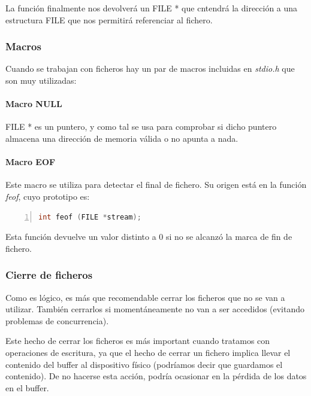 \documentclass[a4paper, 11pt, titlepage]{article}
\begin{document}
            La función finalmente nos devolverá un FILE * que cntendrá la dirección a una estructura FILE 
            que nos permitirá referenciar al fichero. 

        \subsubsection{Macros}

            Cuando se trabajan con ficheros hay un par de macros incluidas en \textit{stdio.h} que son muy 
            utilizadas:

            \paragraph{Macro NULL} FILE * es un puntero, y como tal se usa para comprobar si dicho puntero 
            almacena una dirección de memoria válida o no apunta a nada.

            \paragraph{Macro EOF} Este macro se utiliza para detectar el final de fichero. Su origen está 
            en la función \textit{feof}, cuyo prototipo es:

            \begin{lstlisting}[language=C,numbers=left]
    int feof (FILE *stream);\end{lstlisting}

            Esta función devuelve un valor distinto a 0 si no se alcanzó la marca de fin de fichero.

        \subsubsection{Cierre de ficheros}

            Como es lógico, es más que recomendable cerrar los ficheros que no se van a utilizar. También 
            cerrarlos si momentáneamente no van a ser accedidos (evitando problemas de concurrencia).

            Este hecho de cerrar los ficheros es más important cuando tratamos con operaciones de 
            escritura, ya que el hecho de cerrar un fichero implica llevar el contenido del buffer al 
            dispositivo físico (podríamos decir que guardamos el contenido). De no hacerse esta acción, 
            podría ocasionar en la pérdida de los datos en el buffer.
\end{document}
